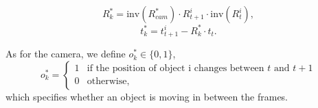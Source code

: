 \begin{equation}
R_k^* = \mathrm{inv}(R_{cam}^*) \cdot R_{t+1}^i \cdot \mathrm{inv}(R_t^i),
\end{equation}
\begin{equation}
t_k^* = t_{t+1}^{i}  - R_k^* \cdot t_t.
\end{equation}

As for the camera, we define $o_k^* \in \{ 0, 1 \}$,
\begin{equation}
o_k^* =
\begin{cases}
1 &\text{if the position of object i changes between $t$ and $t+1$} \\
0 &\text{otherwise,}
\end{cases}
\end{equation}
which specifies whether an object is moving in between the frames.

